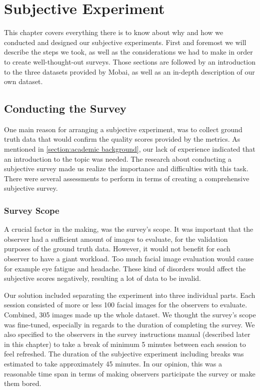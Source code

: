 \chapter{Subjective Experiment}
\label{chap:subjective}
This chapter covers everything there is to know about why and how we conducted and designed our subjective experiments. First and foremost we will describe the steps we took, as well as the considerations we had to make in order to create well-thought-out surveys. Those sections are followed by an introduction to the three datasets provided by Mobai, as well as an in-depth description of our own dataset. 

\section{Conducting the Survey}
\label{sec:ConductingSurvey}
One main reason for arranging a subjective experiment, was to collect ground truth data that would confirm the quality scores provided by the metrics. As mentioned in \ref{section:academic background}, our lack of experience indicated that an introduction to the topic was needed. The research about conducting a subjective survey made us realize the importance and difficulties with this task. There were several assessments to perform in terms of creating a comprehensive subjective survey.

\subsection*{Survey Scope}
A crucial factor in the making, was the survey's scope. It was important that the observer had a sufficient amount of images to evaluate, for the validation purposes of the ground truth data. However, it would not benefit for each observer to have a giant workload. Too much facial image evaluation would cause for example eye fatigue and headache. These kind of disorders would affect the subjective scores negatively, resulting a lot of data to be invalid. 

Our solution included separating the experiment into three individual parts. Each session consisted of more or less 100 facial images for the observers to evaluate. Combined, 305 images made up the whole dataset. We thought the survey's scope was fine-tuned, especially in regards to the duration of completing the survey. We also specified to the observers in the survey instructions manual (described later in this chapter) to take a break of minimum 5 minutes between each session to feel refreshed. The duration of the subjective experiment including breaks was estimated to take approximately 45 minutes. In our opinion, this was a reasonable time span in terms of making observers participate the survey or make them bored. 

